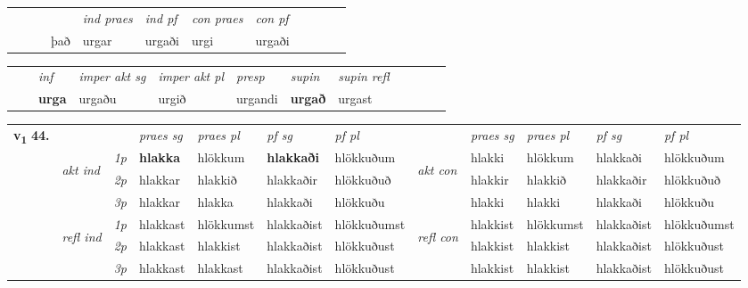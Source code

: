 \begin{tabular}{llllllllllll}
 & &  & &  \textit{ind praes} & \textit{ind pf} & \textit{con praes} & \textit{con pf} \\*
&  & & það & urgar & urgaði & urgi & urgaði \\*
\cmidrule{5-9}
\end{tabular}


\begin{tabular}{llllllllllll}
 & & \textit{inf} & \textit{imper akt sg} & \textit{imper akt pl}   & \textit{presp} & \textit{supin} & \textit{supin refl}      \\*
  & & \textbf{urga} & urgaðu  & urgið   & urgandi &  \textbf{urgað} & urgast  \\*
\cmidrule{1-12}
\end{tabular}



\begin{tabular}{llllllllllll} \toprule
\multirow{4}{*}{{{\textbf{v{\textsubscript{1}}} \Large{\textbf{44.}}}}}  & &   &  \textit{praes sg}  & \textit{praes pl}  &\textit{ pf sg} & \textit{pf pl} &  &  \textit{praes sg}  & \textit{praes pl}  & \textit{pf sg} & \textit{pf pl } \\*
	\cmidrule{4-7} \cmidrule{9-12}
 & \multirow{3}{*}{\begin{turn}{90}\textit{akt ind}\end{turn}} & {\textit{1p}} & \textbf{hlakka} & hlökkum    & \textbf{hlakkaði} & hlökkuðum & \multirow{3}{*}{\begin{turn}{90}\textit{akt con}\end{turn}} &hlakki & hlökkum & hlakkaði & hlökkuðum\\*
& &  {\textit{2p}} &  hlakkar  & hlakkið   & hlakkaðir & hlökkuðuð & & hlakkir & hlakkið & hlakkaðir & hlökkuðuð \\*
& &  {\textit{3p}} & hlakkar & hlakka   & hlakkaði & hlökkuðu & & hlakki & hlakki& hlakkaði & hlökkuðu  \\*
\cmidrule{4-7} \cmidrule{9-12}
 &\multirow{3}{*}{\begin{turn}{90}\textit{refl ind}\end{turn}} & {\textit{1p}} & hlakkast & hlökkumst    & hlakkaðist & hlökkuðumst & \multirow{3}{*}{\begin{turn}{90}\textit{refl con}\end{turn}}  &hlakkist & hlökkumst & hlakkaðist & hlökkuðumst\\*
 &&  {\textit{2p}} &  hlakkast  & hlakkist   & hlakkaðist & hlökkuðust & &hlakkist & hlakkist & hlakkaðist & hlökkuðust \\*
& &  {\textit{3p}} & hlakkast & hlakkast   & hlakkaðist & hlökkuðust & & hlakkist & hlakkist& hlakkaðist & hlökkuðust  \\*
\cmidrule{4-7} \cmidrule{9-12}
\end{tabular}


